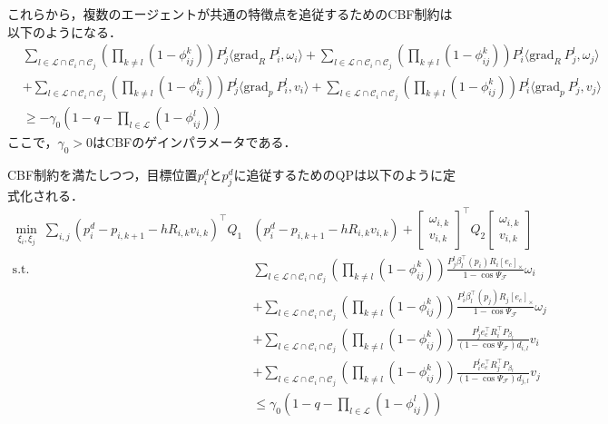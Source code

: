 これらから，複数のエージェントが共通の特徴点を追従するためのCBF制約は以下のようになる．
\begin{equation}
\begin{aligned}
&\sum_{l\in \mathcal{L}\cap\mathcal{C}_i \cap \mathcal{C}_j}(\prod_{k\neq l}(1-\phi_{ij}^k))P_j^l \langle \mathrm{grad}_R\:P_i^l,\omega_i\rangle + \sum_{l\in \mathcal{L}\cap\mathcal{C}_i \cap \mathcal{C}_j}(\prod_{k\neq l}(1-\phi_{ij}^k))P_i^l \langle \mathrm{grad}_R\:P_j^l,\omega_j \rangle \\
&+ \sum_{l\in \mathcal{L}\cap\mathcal{C}_i \cap \mathcal{C}_j}(\prod_{k\neq l}(1-\phi_{ij}^k))P_j^l \langle \mathrm{grad}_p\:P_i^l,v_i\rangle + \sum_{l\in \mathcal{L}\cap\mathcal{C}_i \cap \mathcal{C}_j}(\prod_{k\neq l}(1-\phi_{ij}^k))P_i^l \langle \mathrm{grad}_p\:P_j^l, v_j\rangle \\
&\geq -\gamma_0 (1-q-\prod_{l\in\mathcal{L}}(1-\phi_{ij}^l))
\label{eq:cbf_constraint_edge}
\end{aligned}
\end{equation}
ここで，$\gamma_0 > 0$はCBFのゲインパラメータである．

CBF制約を満たしつつ，目標位置$p_i^d$と$p_j^d$に追従するためのQPは以下のように定式化される．
\begin{equation}
\begin{aligned}
\min_{\xi_i, \xi_j} \: \sum_{i,j}(p^d_{i}-p_{i,{k+1}}-hR_{i,k}v_{i,k})^\top Q_1 & (p^d_{i}-p_{i,{k+1}}-hR_{i,k}v_{i,k})
+ 
\begin{bmatrix}
\omega_{i,k}\\v_{i,k}
\end{bmatrix}^\top Q_2
\begin{bmatrix}
\omega_{i,k}\\v_{i,k}
\end{bmatrix} \\
\mathrm{s.t.} \quad
&\sum_{l\in \mathcal{L}\cap\mathcal{C}_i \cap \mathcal{C}_j}(\prod_{k\neq l}(1-\phi_{ij}^k)) \frac{P_j^l\beta_l^\top(p_i) R_i [e_c]_\times}{1-\cos \Psi_\mathcal{F}}\omega_i \\
&+ \sum_{l\in \mathcal{L}\cap\mathcal{C}_i \cap \mathcal{C}_j}(\prod_{k\neq l}(1-\phi_{ij}^k)) 
\frac{P_i^l\beta_l^\top(p_j) R_j [e_c]_\times}{1-\cos \Psi_\mathcal{F}}\omega_j \\
&+ \sum_{l\in \mathcal{L}\cap\mathcal{C}_i \cap \mathcal{C}_j}(\prod_{k\neq l}(1-\phi_{ij}^k))\frac{P_j^le_c^\top R_i^\top P_{\beta_l}}{(1-\cos \Psi_\mathcal{F})d_{i,l}}v_i \\
&+ \sum_{l\in \mathcal{L}\cap\mathcal{C}_i \cap \mathcal{C}_j}(\prod_{k\neq l}(1-\phi_{ij}^k))\frac{P_i^le_c^\top R_j^\top P_{\beta_l}}{(1-\cos \Psi_\mathcal{F})d_{j,l}}v_j \\
&\leq \gamma_0 (1-q-\prod_{l\in\mathcal{L}}(1-\phi_{ij}^l))
\label{eq:qp_edge}
\end{aligned}
\end{equation}

